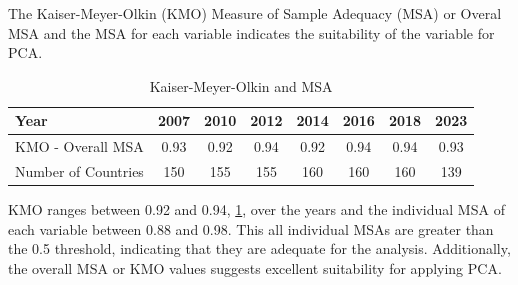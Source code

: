 \documentclass[a4paper,11pt,twoside]{article}
\begin{document}
The Kaiser-Meyer-Olkin (KMO) Measure of Sample Adequacy (MSA) or Overal MSA and the MSA for each variable indicates the suitability of the variable for PCA. 


\begin{table}[h]
  \caption{Kaiser-Meyer-Olkin and MSA}
  \label{tab:kmo}
  \centering
\begin{tabular}{lccccccc}
\hline
Year &	\textbf{2007}	&	\textbf{2010}	&	\textbf{2012}	&	\textbf{2014}	&	\textbf{2016}	&	\textbf{2018}	&	\textbf{2023}	\\  
\hline
\hline
KMO - Overall MSA	&	0.93	&	0.92	&	0.94	&	0.92	&	0.94	&	0.94	&	0.93	\\	 
\hline
Number of Countries	&	150	&	155	&	155	&	160	&	160	&	160	&	139\\	
\hline
\end{tabular}
\end{table}

KMO ranges between 0.92 and 0.94, \ref{tab:kmo}, over the years
and the individual MSA of each variable between 0.88 and 0.98.
This all individual MSAs are greater than the 0.5 threshold, indicating that they are adequate for the analysis. Additionally, the overall MSA or KMO  values suggests excellent suitability for applying PCA. %


\end{document}
